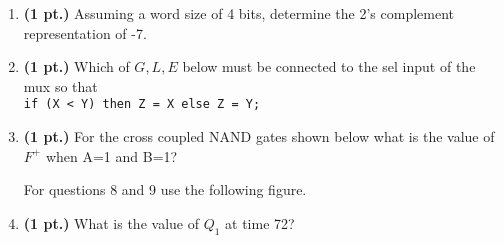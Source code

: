 \documentclass{article}
\begin{document}
\begin{enumerate}
\pagebreak
\item {\bf (1 pt.)} Assuming a word size of 4 bits, determine the 2's complement
representation of -7.

\item {\bf (1 pt.)} Which of $G,L,E$ below must be connected to the 
sel input of the mux so that \\
\verb+if (X < Y) then Z = X else Z = Y;+



\item {\bf (1 pt.)} For the cross coupled NAND gates shown below what 
is the value of $F^+$ when A=1 and B=1?

\begin{figure}[ht]
\centerline{}
\end{figure}

\pagebreak
For questions 8 and 9 use the following figure.
\begin{figure}[ht]
\centerline{}
\end{figure}

\item {\bf (1 pt.)} What is the value of $Q_1$ at time 72?


\end{enumerate}
\end{document}
